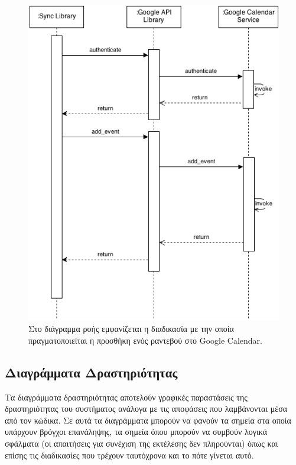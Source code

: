 \begin{figure}[H]
\centering
\includegraphics[width=150mm]{images/sd-sync-appointment.png}
\caption{Στο διάγραμμα ροής εμφανίζεται η διαδικασία με την οποία πραγματοποιείται η προσθήκη ενός ραντεβού στο Google Calendar.}
\label{sd-save-appointment}
\end{figure}

\subsection{Διαγράμματα Δραστηριότητας}
Τα διαγράμματα δραστηριότητας αποτελούν γραφικές παραστάσεις της δραστηριότητας του συστήματος ανάλογα με τις αποφάσεις που λαμβάνονται μέσα από τον κώδικα. Σε αυτά τα διαγράμματα μπορούν να φανούν τα σημεία στα οποία υπάρχουν βρόγχοι επανάληψης, τα σημεία όπου μπορούν να συμβούν λογικά σφάλματα (οι απαιτήσεις για συνέχιση της εκτέλεσης δεν πληρούνται) όπως και επίσης τις διαδικασίες που τρέχουν ταυτόχρονα και το πότε γίνεται αυτό.

